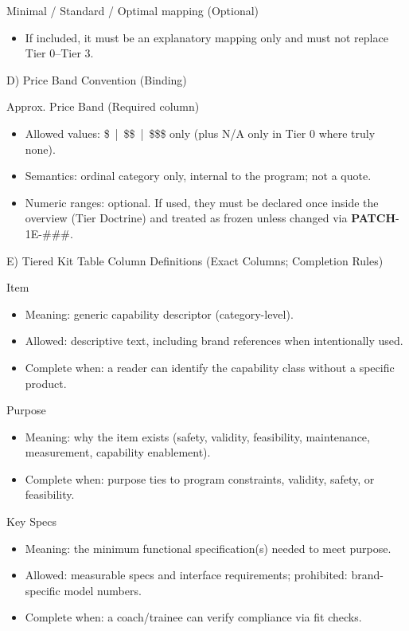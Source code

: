 \documentclass[10pt]{article}
\begin{document}
Minimal / Standard / Optimal mapping (Optional)

\begin{itemize}
\item If included, it must be an explanatory mapping only and must not replace Tier 0–Tier 3.
\end{itemize}

D) Price Band Convention (Binding)

Approx. Price Band (Required column)

\begin{itemize}
\item Allowed values: \$ \,|\, \$\$ \,|\, \$\$\$ only (plus N/A only in Tier 0 where truly none).
\item Semantics: ordinal category only, internal to the program; not a quote.
\item Numeric ranges: optional. If used, they must be declared once inside the overview (Tier Doctrine) and treated as frozen unless changed via \textbf{PATCH}-1E-\#\#\#.
\end{itemize}

E) Tiered Kit Table Column Definitions (Exact Columns; Completion Rules)

Item

\begin{itemize}
\item Meaning: generic capability descriptor (category-level).
\item Allowed: descriptive text, including brand references when intentionally used.
\item Complete when: a reader can identify the capability class without a specific product.
\end{itemize}

Purpose

\begin{itemize}
\item Meaning: why the item exists (safety, validity, feasibility, maintenance, measurement, capability enablement).
\item Complete when: purpose ties to program constraints, validity, safety, or feasibility.
\end{itemize}

Key Specs

\begin{itemize}
\item Meaning: the minimum functional specification(s) needed to meet purpose.
\item Allowed: measurable specs and interface requirements; prohibited: brand-specific model numbers.
\item Complete when: a coach/trainee can verify compliance via fit checks.
\end{itemize}
\end{document}
